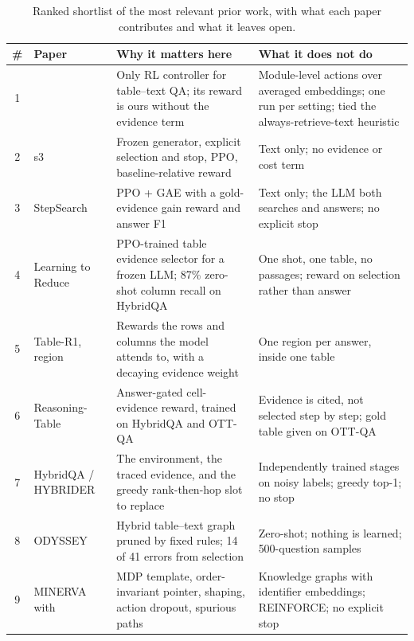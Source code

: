 \begin{table}[ht]
\centering
\footnotesize
\caption{Ranked shortlist of the most relevant prior work, with what each paper contributes and what it leaves open.}
\label{tab:top12}
\begin{tabularx}{\textwidth}{@{}c>{\raggedright\arraybackslash}p{3.2cm}>{\raggedright\arraybackslash}X>{\raggedright\arraybackslash}X@{}}
\toprule
\# & Paper & Why it matters here & What it does not do \\
\midrule
1 & \citet{jose2024qatexttablesdrl} & Only RL controller for table--text QA; its reward is ours without the evidence term & Module-level actions over averaged embeddings; one run per setting; tied the always-retrieve-text heuristic \\
2 & s3 \citep{jiang2025s3} & Frozen generator, explicit selection and stop, PPO, baseline-relative reward & Text only; no evidence or cost term \\
3 & StepSearch \citep{wang2025stepsearch} & PPO + GAE with a gold-evidence gain reward and answer F1 & Text only; the LLM both searches and answers; no explicit stop \\
4 & Learning to Reduce \citep{lee2024learningtoreduce} & PPO-trained table evidence selector for a frozen LLM; 87\% zero-shot column recall on HybridQA & One shot, one table, no passages; reward on selection rather than answer \\
5 & Table-R1, region \citep{wu2025tabler1region} & Rewards the rows and columns the model attends to, with a decaying evidence weight & One region per answer, inside one table \\
6 & Reasoning-Table \citep{lei2025reasoningtable} & Answer-gated cell-evidence reward, trained on HybridQA and OTT-QA & Evidence is cited, not selected step by step; gold table given on OTT-QA \\
7 & HybridQA / HYBRIDER \citep{chen-etal-2020-hybridqa} & The environment, the traced evidence, and the greedy rank-then-hop slot to replace & Independently trained stages on noisy labels; greedy top-1; no stop \\
8 & ODYSSEY \citep{agarwal-etal-2025-hybrid} & Hybrid table--text graph pruned by fixed rules; 14 of 41 errors from selection & Zero-shot; nothing is learned; 500-question samples \\
9 & MINERVA \citep{das2018minerva} with \citet{lin2018multihop} & MDP template, order-invariant pointer, shaping, action dropout, spurious paths & Knowledge graphs with identifier embeddings; REINFORCE; no explicit stop \\

\end{tabularx}
\end{table}
